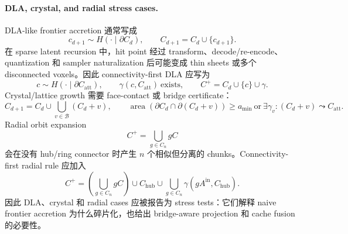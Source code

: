 \paragraph{DLA, crystal, and radial stress cases.}
DLA-like frontier accretion 通常写成
\begin{equation}
c_{d+1}\sim H(\cdot\mid\partial C_d),\qquad
C_{d+1}=C_d\cup\{c_{d+1}\}.
\end{equation}
在 sparse latent recursion 中，hit point 经过 transform、decode/re-encode、quantization 和 sampler naturalization 后可能变成 thin sheets 或多个 disconnected voxels。因此 connectivity-first DLA 应写为
\begin{equation}
c\sim H(\cdot\mid\partial C_{\mathrm{att}}),\qquad
\gamma(c,C_{\mathrm{att}})\ \mathrm{exists},\qquad
C^+=C_d\cup\{c\}\cup\gamma .
\end{equation}
Crystal/lattice growth 需要 face-contact 或 bridge certificate：
\begin{equation}
C_{d+1}=C_d\cup\bigcup_{v\in\mathcal B}(C_d+v),\qquad
\operatorname{area}(\partial C_d\cap\partial(C_d+v))\ge a_{\min}
\ \mathrm{or}\ 
\exists\gamma_v:(C_d+v)\leadsto C_{\mathrm{att}} .
\end{equation}
Radial orbit expansion
\begin{equation}
C^+=\bigcup_{g\in C_n} gC
\end{equation}
会在没有 hub/ring connector 时产生 \(n\) 个相似但分离的 chunks。Connectivity-first radial rule 应加入
\begin{equation}
C^+=
\left(\bigcup_{g\in C_n}gC\right)
\cup C_{\mathrm{hub}}
\cup\bigcup_{g\in C_n}\gamma(gA^{\mathrm{in}},C_{\mathrm{hub}}).
\end{equation}
因此 DLA、crystal 和 radial cases 应被报告为 stress tests：它们解释 naive frontier accretion 为什么碎片化，也给出 bridge-aware projection 和 cache fusion 的必要性。

